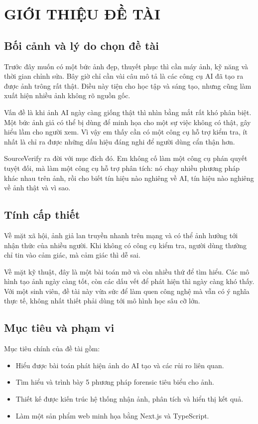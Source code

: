 \chapter{GIỚI THIỆU ĐỀ TÀI}

\section{Bối cảnh và lý do chọn đề tài}
Trước đây muốn có một bức ảnh đẹp, thuyết phục thì cần máy ảnh, kỹ năng và thời gian chỉnh sửa. Bây giờ chỉ cần vài câu mô tả là các công cụ AI đã tạo ra được ảnh trông rất thật. Điều này tiện cho học tập và sáng tạo, nhưng cũng làm xuất hiện nhiều ảnh không rõ nguồn gốc.

Vấn đề là khi ảnh AI ngày càng giống thật thì nhìn bằng mắt rất khó phân biệt. Một bức ảnh giả có thể bị dùng để minh họa cho một sự việc không có thật, gây hiểu lầm cho người xem. Vì vậy em thấy cần có một công cụ hỗ trợ kiểm tra, ít nhất là chỉ ra được những dấu hiệu đáng nghi để người dùng cẩn thận hơn.

SourceVerify ra đời với mục đích đó. Em không cố làm một công cụ phán quyết tuyệt đối, mà làm một công cụ hỗ trợ phân tích: nó chạy nhiều phương pháp khác nhau trên ảnh, rồi cho biết tín hiệu nào nghiêng về AI, tín hiệu nào nghiêng về ảnh thật và vì sao.

\section{Tính cấp thiết}
Về mặt xã hội, ảnh giả lan truyền nhanh trên mạng và có thể ảnh hưởng tới nhận thức của nhiều người. Khi không có công cụ kiểm tra, người dùng thường chỉ tin vào cảm giác, mà cảm giác thì dễ sai.

Về mặt kỹ thuật, đây là một bài toán mở và còn nhiều thứ để tìm hiểu. Các mô hình tạo ảnh ngày càng tốt, còn các dấu vết để phát hiện thì ngày càng khó thấy. Với một sinh viên, đề tài này vừa sức để làm quen công nghệ mà vẫn có ý nghĩa thực tế, không nhất thiết phải dùng tới mô hình học sâu cỡ lớn.

\section{Mục tiêu và phạm vi}
Mục tiêu chính của đề tài gồm:
\begin{itemize}
  \item Hiểu được bài toán phát hiện ảnh do AI tạo và các rủi ro liên quan.
  \item Tìm hiểu và trình bày 5 phương pháp forensic tiêu biểu cho ảnh.
  \item Thiết kế được kiến trúc hệ thống nhận ảnh, phân tích và hiển thị kết quả.
  \item Làm một sản phẩm web minh họa bằng Next.js và TypeScript.
\end{itemize}

